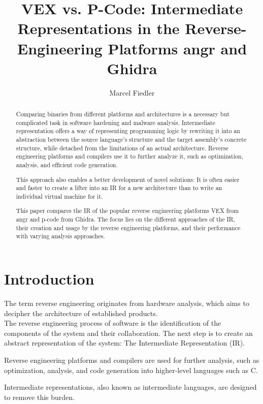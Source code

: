 \documentclass[seminar]{plai}
\title{VEX vs. P-Code: Intermediate Representations in the Reverse-Engineering Platforms angr and Ghidra}
\author{Marcel Fiedler}
\begin{document}
\maketitle

\begin{abstract}

\noindent Comparing binaries from different platforms and architectures is a necessary but complicated task in software hardening and malware analysis. Intermediate representation offers a way of representing programming logic by rewriting it into an abstraction between the source language's structure and the target assembly's concrete structure, while detached from the limitations of an actual architecture. Reverse engineering platforms and compilers use it to further analyze it, such as optimization, analysis, and efficient code generation.

This approach also enables a better development of novel solutions: It is often easier and faster to create a lifter into an IR for a new architecture than to write an individual virtual machine for it.

\noindent This paper compares the IR of the popular reverse engineering platforms VEX from angr and p-code from Ghidra.
The focus lies on the different approaches of the IR, their creation and usage by the reverse engineering platforms, and their performance with varying analysis approaches.
\end{abstract}

\section{Introduction}
\label{sec:introduction}

The term reverse engineering originates from hardware analysis, which aims to decipher the architecture of established products.\cite{reverse-engineering-design-recovery-taxonomy}\\
The reverse engineering process of software is the identification of the components of the system and their collaboration. The next step is to create an abstract representation of the system: The Intermediate Representation (IR).

Reverse engineering platforms and compilers are used for further analysis, such as optimization, analysis, and code generation into higher-level languages such as C.

Intermediate representations, also known as intermediate languages, are designed to remove this burden.
\end{document}
